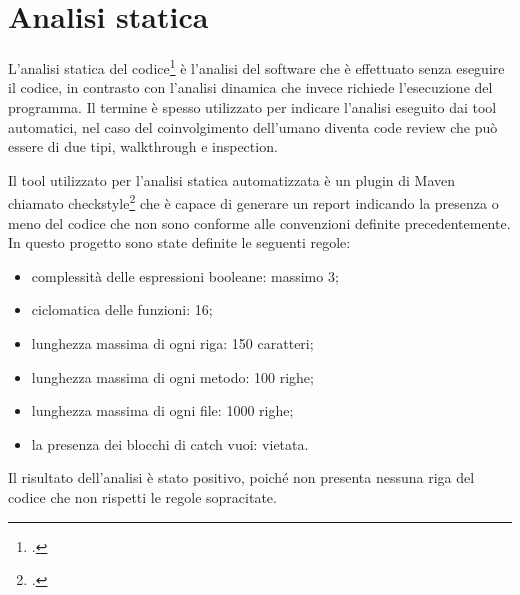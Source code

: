 \section{Analisi statica}\label{sec:analisi-statica}

L'analisi statica del codice\footcite{site:analisi_static} è l'analisi del software che è effettuato senza eseguire il codice, in contrasto con l'analisi dinamica che invece richiede l'esecuzione del programma.
Il termine è spesso utilizzato per indicare l'analisi eseguito dai tool automatici, nel caso del coinvolgimento dell'umano diventa code review che può essere di due tipi, \gls{walkthrough} e \gls{inspection}.

Il tool utilizzato per l'analisi statica automatizzata è un plugin di Maven chiamato checkstyle\footcite{site:checkstyle} che è capace di generare un report indicando la presenza o meno del codice che non sono conforme alle convenzioni definite precedentemente.
In questo progetto sono state definite le seguenti regole:
\begin{itemize}
    \item complessità delle espressioni booleane: massimo 3;
    \item \gls{ciclomatica} delle funzioni: 16;
    \item lunghezza massima di ogni riga: 150 caratteri;
    \item lunghezza massima di ogni metodo: 100 righe;
    \item lunghezza massima di ogni file: 1000 righe;
    \item la presenza dei blocchi di catch vuoi: vietata.
\end{itemize}

Il risultato dell'analisi è stato positivo, poiché non presenta nessuna riga del codice che non rispetti le regole sopracitate.
